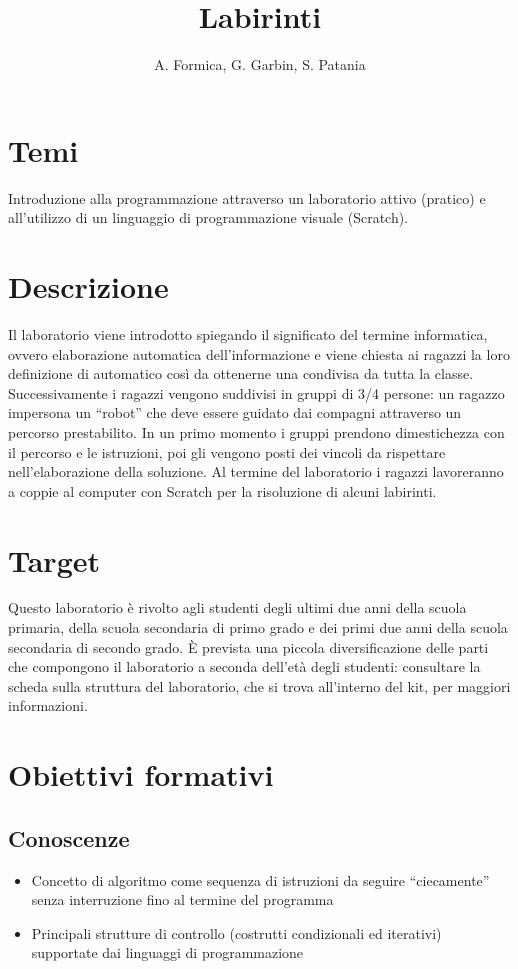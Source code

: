 \documentclass[12pt]{article}
\title{Labirinti}
\author{A. Formica, G. Garbin, S. Patania}
\begin{document}
\maketitle
%
% 
\section{Temi}
Introduzione alla programmazione attraverso un laboratorio attivo (pratico) e all’utilizzo di un linguaggio di programmazione visuale (Scratch).
%
%
\section{Descrizione}
Il laboratorio viene introdotto spiegando il significato del termine informatica, ovvero elaborazione automatica dell’informazione e viene chiesta ai ragazzi la loro definizione di automatico così da ottenerne una condivisa da tutta la classe. Successivamente i ragazzi vengono suddivisi in gruppi di 3/4 persone: un ragazzo impersona un “robot” che deve essere guidato dai compagni attraverso un percorso prestabilito. In un primo momento i gruppi prendono dimestichezza con il percorso e le istruzioni, poi gli vengono posti dei vincoli da rispettare nell'elaborazione della soluzione. Al termine del laboratorio i ragazzi lavoreranno a coppie al computer con Scratch per la risoluzione di alcuni labirinti.
%
%
\section{Target}
Questo laboratorio è rivolto agli studenti degli ultimi due anni della scuola primaria, della scuola secondaria di primo grado e dei primi due anni della scuola secondaria di secondo grado.
\`E prevista una piccola diversificazione delle parti che compongono il laboratorio a seconda dell'età degli studenti: consultare la scheda sulla struttura del laboratorio, che si trova all'interno del kit, per maggiori informazioni.
%
%
\section{Obiettivi formativi}
\subsection{Conoscenze}
\begin{itemize}
\item Concetto di algoritmo come sequenza di istruzioni da seguire “ciecamente” senza interruzione fino al termine del programma
\item Principali strutture di controllo (costrutti condizionali ed iterativi) supportate dai linguaggi di programmazione
\end{itemize}
\end{document}
